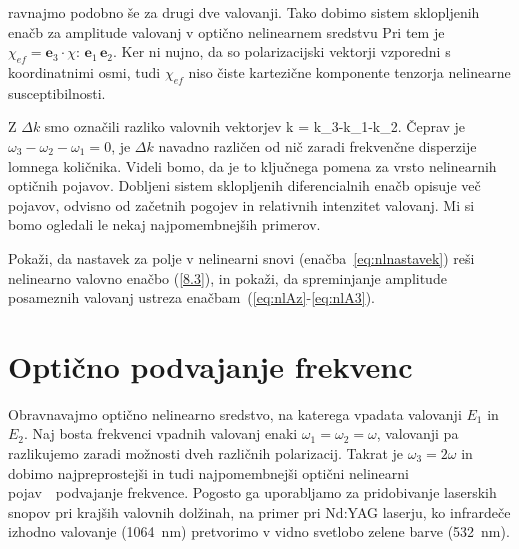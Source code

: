 ravnajmo podobno še za drugi dve valovanji. Tako dobimo sistem sklopljenih
enačb za amplitude valovanj v optično nelinearnem sredstvu
Pri tem je $\chi_{ef}=\mathbf{e}_{3}\cdot\chi:\,\mathbf{e}_{1}\,\mathbf{e}_{2}$.
Ker ni nujno, da so polarizacijski vektorji vzporedni s koordinatnimi osmi, tudi $\chi_{ef}$ 
niso čiste kartezične komponente tenzorja nelinearne susceptibilnosti. 

Z $\Delta k$ smo označili razliko valovnih vektorjev
\beq
\Delta k = k_{3}-k_{1}-k_{2}.
\eeq
Čeprav je $\omega_{3}-\omega_{2}-\omega_{1}=0$, je $\Delta k$ navadno različen od nič zaradi 
frekvenčne disperzije lomnega količnika. Videli bomo, da je to ključnega pomena 
za vrsto nelinearnih optičnih pojavov. Dobljeni sistem sklopljenih diferencialnih enačb opisuje več pojavov, 
odvisno od začetnih pogojev in relativnih intenzitet valovanj. Mi si bomo ogledali le nekaj
najpomembnejših primerov.
\begin{definition}
Pokaži, da nastavek za polje v nelinearni snovi (enačba~\ref{eq:nlnastavek}) reši nelinearno
valovno enačbo (\ref{8.3}), in pokaži, da spreminjanje amplitude posameznih valovanj 
ustreza enačbam~(\ref{eq:nlAz}-\ref{eq:nlA3}).
\end{definition}

\section{Optično podvajanje frekvenc}

Obravnavajmo optično nelinearno sredstvo, na katerega vpadata valovanji $E_1$ in $E_2$.
Naj bosta frekvenci vpadnih valovanj enaki $\omega_{1}=\omega_{2}=\omega$, valovanji
pa razlikujemo zaradi možnosti dveh različnih polarizacij. Takrat je $\omega_{3}=2\omega$
in dobimo najpreprostejši in tudi najpomembnejši optični nelinearni pojav~\textendash~podvajanje 
frekvence. 
Pogosto ga uporabljamo za pridobivanje laserskih snopov pri krajših valovnih dolžinah, na primer
pri Nd:YAG laserju, ko infrardeče izhodno valovanje (1064~nm) 
pretvorimo v vidno svetlobo zelene barve (532~nm). 

